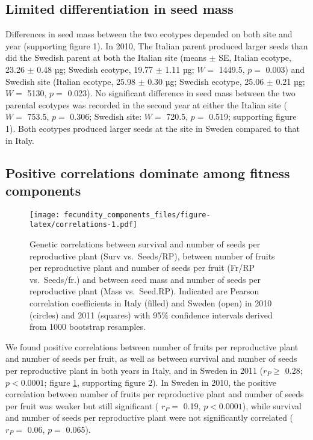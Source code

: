 \documentclass[12pt,]{article}
\begin{document}
\hypertarget{limited-differentiation-in-seed-mass}{%
\subsection{Limited differentiation in seed mass}\label{limited-differentiation-in-seed-mass}}

Differences in seed mass between the two ecotypes depended on both site and year (supporting figure 1).
In 2010, The Italian parent produced larger seeds than did the Swedish parent at both the Italian site
(means \(\pm\) SE, Italian ecotype,
23.26
\(\pm\)
0.48
µg; Swedish ecotype,
19.77
\(\pm\)
1.11
µg;
\(W =\) 1449.5,
\(p=\) 0.003)
and Swedish site
(Italian ecotype,
25.98
\(\pm\)
0.30
µg; Swedish ecotype,
25.06
\(\pm\)
0.21
µg;
\(W =\) 5130,
\(p=\) 0.023).
No significant difference in seed mass between the two parental ecotypes was recorded in the second year at either the Italian site
(
\(W =\) 753.5, \(p=\) 0.306;
Swedish site:
\(W =\) 720.5, \(p=\) 0.519;
supporting figure 1).
Both ecotypes produced larger seeds at the site in Sweden compared to that in Italy.

\hypertarget{positive-correlations-dominate-among-fitness-components}{%
\subsection{Positive correlations dominate among fitness components}\label{positive-correlations-dominate-among-fitness-components}}

\begin{figure}
\centering
\texttt{[image: fecundity\_components\_files/figure-latex/correlations-1.pdf]}
\caption{\label{fig:correlations}Genetic correlations between survival and number of seeds per reproductive plant (Surv vs.~Seeds/RP), between number of fruits per reproductive plant and number of seeds per fruit (Fr/RP vs.~Seeds/fr.) and between seed mass and number of seeds per reproductive plant (Mass vs.~Seed.RP). Indicated are Pearson correlation coefficients in Italy (filled) and Sweden (open) in 2010 (circles) and 2011 (squares) with 95\% confidence intervals derived from 1000 bootstrap resamples.}
\end{figure}

We found positive correlations between number of fruits per reproductive plant and number of seeds per fruit, as well as between survival and number of seeds per reproductive plant in both years in Italy, and in Sweden in 2011 (\(r_P \geq\)
0.28;
\(p < 0.0001\);
figure \ref{fig:correlations}, supporting figure 2).
In Sweden in 2010, the positive correlation between number of fruits per reproductive plant and number of seeds per fruit was weaker but still significant (
\(r_P=\) 0.19,
\(p<0.0001\)),
while survival and number of seeds per reproductive plant were not significantly correlated
(\(r_P=\) 0.06,
\(p=\) 0.065).
\end{document}
